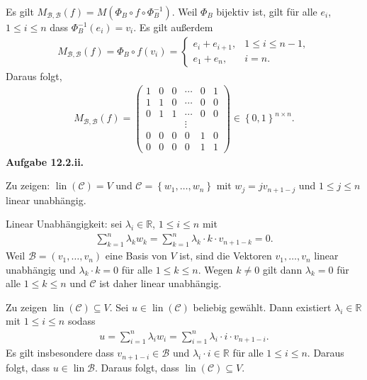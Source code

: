 \documentclass[12pt]{extarticle}
\newcommand{\mg}[1]{\mathbb{#1}}
\newcommand{\mc}[1]{\mathcal{#1}}
\newcommand{\lin}{\operatorname{lin}}
\newcommand{\aufgn}[1]{\textbf{Aufgabe #1.}}
\begin{document}
Es gilt
$M_{\mc{B},\mc{B}}(f)=M(\Phi_B \circ f \circ
\Phi_B^{-1})$.  Weil \(\Phi_B\) bijektiv ist, gilt für
alle \(e_i\), \(1 \le i \le n\) dass $\Phi_B^{-1}(e_i) =
v_i$.  Es gilt außerdem
\begin{align*}
M_{\mc{B},\mc{B}}(f) = \Phi_B \circ f(v_i) =
\begin{cases}
  e_i + e_{i+1}, & 1 \le i \le n - 1, \\
  e_1 + e_n, & i = n.
\end{cases}
\end{align*}
Daraus folgt,
\begin{align*}
M_{\mc{B},\mc{B}}(f) =
\begin{pmatrix}
  1 & 0 & 0 & \cdots & 0 & 1 \\
  1 & 1 & 0 & \cdots & 0 & 0 \\
  0 & 1 & 1 & \cdots & 0 & 0 \\
    &   &   & \vdots &   &   \\
  0 & 0 & 0 & 0      & 1 & 0 \\
  0 & 0 & 0 & 0      & 1 & 1
\end{pmatrix} \in \left\{ 0, 1 \right\}^{n \times n}.
\end{align*}
\aufgn{12.2.ii}

Zu zeigen: \(\lin(\mc{C}) = V\) und
\(\mc{C}= \left\{ w_1, \ldots, w_n \right\}\) mit
\(w_j = j v_{n+1-j}\) und \(1 \le j \le n\) linear
unabhängig.

Linear Unabhängigkeit:  sei \(\lambda_i \in \mg{R}\), $1
\le i \le n$ mit
\begin{align*}
\sum_{k = 1}^n{\lambda_k w_k} = \sum_{k=1}^n{\lambda_k
  \cdot k \cdot v_{n+1-k}} = 0.
\end{align*}
Weil \(\mc{B} = \left( v_1, \ldots, v_n \right)\) eine
Basis von \(V\) ist, sind die Vektoren \(v_1, \ldots, v_n\)
linear unabhängig und \(\lambda_k \cdot k = 0\) für alle
\(1 \le k \le n\).  Wegen \(k \ne 0\) gilt dann
\(\lambda_k = 0\) für alle \(1 \le k \le n\) und \(\mc{C}\)
ist daher linear unabhängig.

Zu zeigen \(\lin(\mc{C}) \subseteq V\).  Sei $u \in
\lin(\mc{C})$ beliebig gewählt.  Dann existiert
\(\lambda_i \in \mg{R}\) mit \(1 \le i \le n\) sodass
\begin{align*}
u = \sum_{i = 1}^n{\lambda_i w_i} = \sum_{i =
  1}^n{\lambda_i \cdot i \cdot v_{n+1-i}}.
\end{align*}
Es gilt insbesondere dass \(v_{n+1-i} \in \mc{B}\) und
\(\lambda_i \cdot i \in \mg{R}\) für alle $1 \le i \le
n$.  Daraus folgt, dass \(u \in \lin \mc{B}\).  Daraus
folgt, dass \(\lin(\mc{C}) \subseteq V\).
\end{document}
